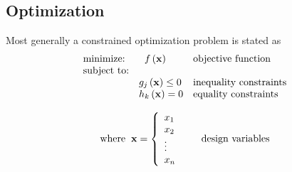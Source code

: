 \documentclass[10pt,a4paper]{article}
\begin{document}
\subsection{Optimization}
Most generally a constrained optimization problem is stated as 
\[
\begin{array}{lll}
\mbox{minimize:} & \hspace{2 mm} f\left(\mathbf{x}\right) & \mbox{objective function}\\
\mbox{subject to:} & & \\
& \centering g_j \left( \mathbf{x} \right) \leq 0 & \mbox{inequality constraints}\\
& \centering h_k \left(\mathbf{x} \right) = 0 & \mbox{equality constraints}
\end{array}
 \]

\[ 
\begin{array}{ll}
\mbox{where} \hspace{2 mm} \mathbf{x} = \left\{ \begin{array}{ll}

x_1 & \\
x_2 & \\
\vdots &\\
x_n &
\end{array} \right. & \mbox{design variables}
\end{array}
\]
\end{document}
